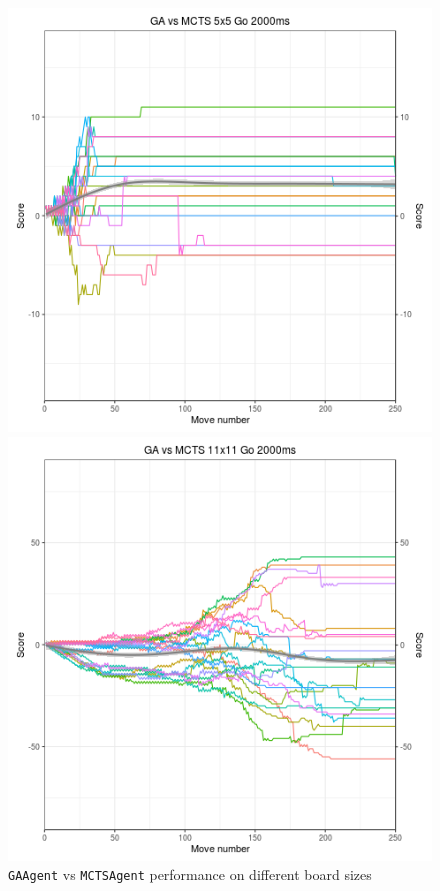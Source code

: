 \begin{figure}[h]
\centering
\begin{minipage}{.45\textwidth}
  \centering
  \includegraphics[scale=0.4]{images/Visualizations/GAvsMCTS/2000ms5x5.png}
\end{minipage}%
\begin{minipage}{.45\textwidth}
  \centering
  \includegraphics[scale=0.4]{images/Visualizations/GAvsMCTS/2000ms11x11.png}
\end{minipage}
\caption{\texttt{GAAgent} vs \texttt{MCTSAgent} performance on different board sizes}
\label{fig:gamcts}
\end{figure}

